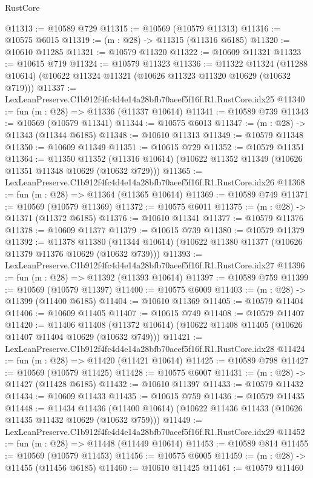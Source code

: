 \begin{lexlean}{RustCore}
\begin{coremodule}
@11313 := @10589 @729
@11315 := @10569 (@10579 @11313)
@11316 := @10575 @6015
@11319 := (m : @28) -> @11315 (@11316 @6185)
@11320 := @10610 @11285
@11321 := @10579 @11320
@11322 := @10609 @11321
@11323 := @10615 @719
@11324 := @10579 @11323
@11336 := @11322
    @11324
    (@11288 @10614)
    (@10622 @11324 @11321 (@10626 @11323 @11320 @10629 (@10632 @719)))
@11337 := LexLeanPreserve.C1b912f4fc4d4e14a28bfb70aeef5f16f.R1.RustCore.idx25
@11340 := fun (m : @28) => @11336 (@11337 @10614)
@11341 := @10589 @739
@11343 := @10569 (@10579 @11341)
@11344 := @10575 @6013
@11347 := (m : @28) -> @11343 (@11344 @6185)
@11348 := @10610 @11313
@11349 := @10579 @11348
@11350 := @10609 @11349
@11351 := @10615 @729
@11352 := @10579 @11351
@11364 := @11350
    @11352
    (@11316 @10614)
    (@10622 @11352 @11349 (@10626 @11351 @11348 @10629 (@10632 @729)))
@11365 := LexLeanPreserve.C1b912f4fc4d4e14a28bfb70aeef5f16f.R1.RustCore.idx26
@11368 := fun (m : @28) => @11364 (@11365 @10614)
@11369 := @10589 @749
@11371 := @10569 (@10579 @11369)
@11372 := @10575 @6011
@11375 := (m : @28) -> @11371 (@11372 @6185)
@11376 := @10610 @11341
@11377 := @10579 @11376
@11378 := @10609 @11377
@11379 := @10615 @739
@11380 := @10579 @11379
@11392 := @11378
    @11380
    (@11344 @10614)
    (@10622 @11380 @11377 (@10626 @11379 @11376 @10629 (@10632 @739)))
@11393 := LexLeanPreserve.C1b912f4fc4d4e14a28bfb70aeef5f16f.R1.RustCore.idx27
@11396 := fun (m : @28) => @11392 (@11393 @10614)
@11397 := @10589 @759
@11399 := @10569 (@10579 @11397)
@11400 := @10575 @6009
@11403 := (m : @28) -> @11399 (@11400 @6185)
@11404 := @10610 @11369
@11405 := @10579 @11404
@11406 := @10609 @11405
@11407 := @10615 @749
@11408 := @10579 @11407
@11420 := @11406
    @11408
    (@11372 @10614)
    (@10622 @11408 @11405 (@10626 @11407 @11404 @10629 (@10632 @749)))
@11421 := LexLeanPreserve.C1b912f4fc4d4e14a28bfb70aeef5f16f.R1.RustCore.idx28
@11424 := fun (m : @28) => @11420 (@11421 @10614)
@11425 := @10589 @798
@11427 := @10569 (@10579 @11425)
@11428 := @10575 @6007
@11431 := (m : @28) -> @11427 (@11428 @6185)
@11432 := @10610 @11397
@11433 := @10579 @11432
@11434 := @10609 @11433
@11435 := @10615 @759
@11436 := @10579 @11435
@11448 := @11434
    @11436
    (@11400 @10614)
    (@10622 @11436 @11433 (@10626 @11435 @11432 @10629 (@10632 @759)))
@11449 := LexLeanPreserve.C1b912f4fc4d4e14a28bfb70aeef5f16f.R1.RustCore.idx29
@11452 := fun (m : @28) => @11448 (@11449 @10614)
@11453 := @10589 @814
@11455 := @10569 (@10579 @11453)
@11456 := @10575 @6005
@11459 := (m : @28) -> @11455 (@11456 @6185)
@11460 := @10610 @11425
@11461 := @10579 @11460

\end{coremodule}
\end{lexlean}
